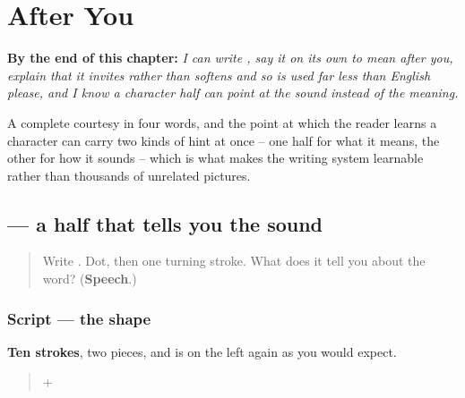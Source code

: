 
\chapter{After You}
\label{ch:zh-qing}

\begin{chapteropening}
\textbf{By the end of this chapter:} \emph{I can write , say it on its own to mean after you, explain that it invites rather than softens and so is used far less than English please, and I know a character half can point at the sound instead of the meaning.}

A complete courtesy in four words, and the point at which the reader learns a character can carry two kinds of hint at once -- one half for what it means, the other for how it sounds -- which is what makes the writing system learnable rather than thousands of unrelated pictures.
\end{chapteropening}

\section[\texorpdfstring{\zh{请} (qǐng)}{请 (qǐng)}]{ — a half that tells you the sound}

\label{lesson:ZH-W11-qing}



\begin{quote}
Write . Dot, then one turning stroke. What does it tell you about the word? (\textbf{Speech}.)
\end{quote}

\subsection*{Script — the shape}

\begin{quote}
\end{quote}

\textbf{Ten strokes}, two pieces, and  is on the left again as you would expect.

\begin{quote}
\textbf{} + \textbf{}
\end{quote}

